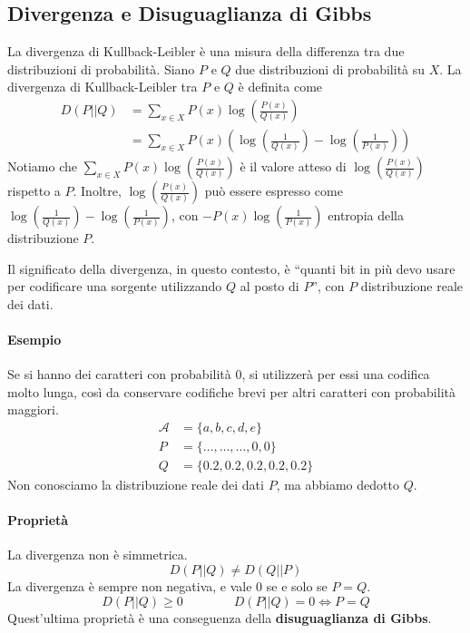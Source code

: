 \subsection{Divergenza e Disuguaglianza di Gibbs}
La divergenza di Kullback-Leibler è una misura della differenza tra due distribuzioni di probabilità. Siano $P$ e $Q$ due distribuzioni di probabilità su $X$. La divergenza di Kullback-Leibler tra $P$ e $Q$ è definita come
\begin{align*}
    D(P||Q) &= \sum_{x\in X} P(x)\log\left(\frac{P(x)}{Q(x)}\right)\\
    &= \sum_{x\in X} P(x) \left( \log\left(\frac{1}{Q(x)}\right) - \log\left(\frac{1}{P(x)}\right) \right)
\end{align*}
Notiamo che $\sum_{x\in X} P(x)\log\left(\frac{P(x)}{Q(x)}\right)$ è il valore atteso di $\log\left(\frac{P(x)}{Q(x)}\right)$ rispetto a $P$. Inoltre, $\log\left(\frac{P(x)}{Q(x)}\right)$ può essere espresso come $\log\left(\frac{1}{Q(x)}\right) - \log\left(\frac{1}{P(x)}\right)$, con $-P(x)\log\left(\frac{1}{P(x)}\right)$ entropia della distribuzione $P$.

Il significato della divergenza, in questo contesto, è ``quanti bit in più devo usare per codificare una sorgente utilizzando $Q$ al posto di $P$'', con $P$ distribuzione reale dei dati.

\paragraph{Esempio} Se si hanno dei caratteri con probabilità 0, si utilizzerà per essi una codifica molto lunga, così da conservare codifiche brevi per altri caratteri con probabilità maggiori.
\begin{align*}
    \mathcal{A} &= \{a,b,c,d,e\}\\
    P &= \{\dots,\dots,\dots,0,0\}\\
    Q &= \{0.2,0.2,0.2,0.2,0.2\}
\end{align*}
Non conosciamo la distribuzione reale dei dati $P$, ma abbiamo dedotto $Q$.

\paragraph{Proprietà} La divergenza non è simmetrica.
$$
    D(P||Q) \neq D(Q||P)
$$
La divergenza è sempre non negativa, e vale 0 se e solo se $P=Q$.
$$
    D(P||Q) \geq 0 \qquad\qquad D(P||Q) = 0 \Leftrightarrow P=Q
$$
Quest'ultima proprietà è una conseguenza della \textbf{disuguaglianza di Gibbs}.



